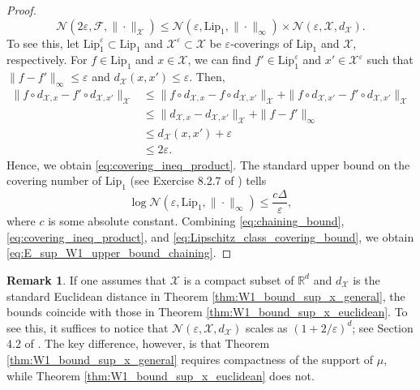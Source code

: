 \documentclass[11pt,letterpaper]{article}
\theoremstyle{definition}
\newtheorem{remark}{Remark}
\numberwithin{equation}{section}
\newcommand{\cF}{\mathcal{F}}
\newcommand{\cN}{\mathcal{N}}
\newcommand{\cX}{\mathcal{X}}
\newcommand{\R}{\mathbb{R}}
\renewcommand{\epsilon}{\varepsilon}
\begin{document}
\begin{proof}
    \begin{equation}
        \label{eq:covering_ineq_product}
        \cN(2 \epsilon, \cF, \|\cdot\|_\cX) \le \cN(\epsilon, \mathrm{Lip}_1, \|\cdot\|_\infty) \times \cN(\epsilon, \cX, d_\cX).
    \end{equation}
    To see this, let $\mathrm{Lip}_1^\epsilon \subset \mathrm{Lip}_1$ and $\cX^\epsilon \subset \cX$ be $\epsilon$-coverings of $\mathrm{Lip}_1$ and $\cX$, respectively. For $f \in \mathrm{Lip}_1$ and $x \in \cX$, we can find $f' \in \mathrm{Lip}_1^\epsilon$ and $x' \in \cX^\epsilon$ such that $\|f - f'\|_\infty \le \epsilon$ and $d_\cX(x, x') \le \epsilon$. Then, 
    \begin{equation*}
        \begin{split}
            \|f \circ d_{\cX, x} - f' \circ d_{\cX, x'}\|_\cX 
            & \le \|f \circ d_{\cX, x} - f \circ d_{\cX, x'}\|_\cX + \|f \circ d_{\cX, x'} - f' \circ d_{\cX, x'}\|_\cX \\
            & \le \|d_{\cX, x} - d_{\cX, x'}\|_\cX + \|f - f'\|_\infty \\
            & \le d_\cX(x, x') + \epsilon \\
            & \le 2 \epsilon.
        \end{split}
    \end{equation*}
    Hence, we obtain \eqref{eq:covering_ineq_product}. The standard upper bound on the covering number of $\mathrm{Lip}_1$ (see Exercise 8.2.7 of \cite{vershynin_2018}) tells
    \begin{equation}
        \label{eq:Lipschitz_class_covering_bound}
        \log \cN(\epsilon, \mathrm{Lip}_1, \|\cdot\|_\infty) \le \frac{c \Delta}{\epsilon},
    \end{equation}
    where $c$ is some absolute constant. Combining \eqref{eq:chaining_bound}, \eqref{eq:covering_ineq_product}, and \eqref{eq:Lipschitz_class_covering_bound}, we obtain \eqref{eq:E_sup_W1_upper_bound_chaining}.
\end{proof}

\begin{remark}
    If one assumes that $\cX$ is a compact subset of $\R^d$ and $d_\cX$ is the standard Euclidean distance in Theorem \ref{thm:W1_bound_sup_x_general}, the bounds coincide with those in Theorem \ref{thm:W1_bound_sup_x_euclidean}. To see this, it suffices to notice that $\cN(\epsilon, \cX, d_\cX)$ scales as $(1 + 2 / \epsilon)^d$; see Section 4.2 of \cite{vershynin_2018}. The key difference, however, is that Theorem \ref{thm:W1_bound_sup_x_general} requires compactness of the support of $\mu$, while Theorem \ref{thm:W1_bound_sup_x_euclidean} does not.
\end{remark}
\end{document}
